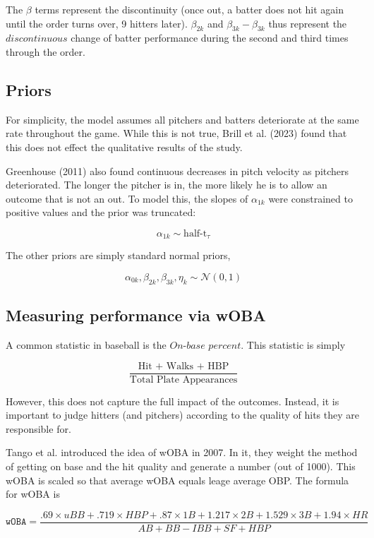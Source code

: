 \documentclass[a4paper,12pt]{article}
\begin{document}
The $\beta$ terms represent the discontinuity (once out, a batter does not hit again until the order turns over, 9 hitters later). $\beta_{2k}$ and $\beta_{3k}-\beta_{3k}$ thus represent the $discontinuous$ change of batter performance during the second and third times through the order.  

\subsection{Priors}

For simplicity, the model assumes all pitchers and batters deteriorate at the same rate throughout the game. While this is not true, Brill et al. (2023) found that this does not effect the qualitative results of the study.

Greenhouse (2011) also found continuous decreases in pitch velocity as pitchers deteriorated. The longer the pitcher is in, the more likely he is to allow an outcome that is not an out. To model this, the slopes of $\alpha_{1k}$ were constrained to positive values and the prior was truncated:

$$ \alpha_{1k} \sim \text{half-t}_{\tau} $$

The other priors are simply standard normal priors,

$$ \alpha_{0k}, \beta_{2k}, \beta_{3k}, \eta_k \sim \mathcal{N}(0,1)$$	


\subsection{Measuring performance via wOBA}

A common statistic in baseball is the $\textit{On-base percent}$. This statistic is simply

$$ \frac{\text{Hit + Walks + HBP}}{\text{Total Plate Appearances}} $$

However, this does not capture the full impact of the outcomes. Instead, it is important to judge hitters (and pitchers) according to the quality of hits they are responsible for.

Tango et al. introduced the idea of wOBA in 2007. In it, they weight the method of getting on base and the hit quality and generate a number (out of 1000). This wOBA is scaled so that average wOBA equals leage average OBP. The formula for wOBA is 

$$ \texttt{wOBA} = \frac{.69 \times uBB + .719 \times HBP + .87 \times 1B + 1.217 \times 2B + 1.529 \times 3B + 1.94 \times HR}{AB + BB - IBB + SF + HBP} $$
\end{document}
